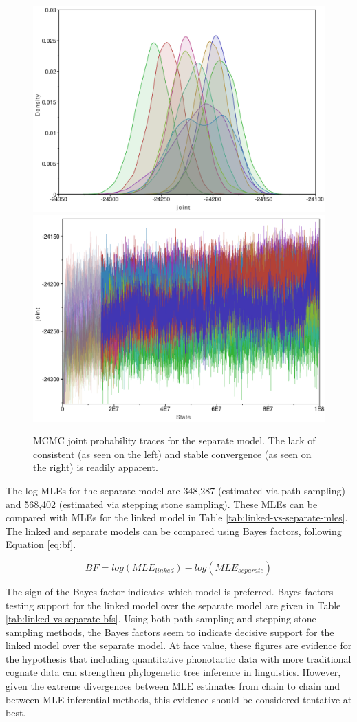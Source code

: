 \begin{figure}
\includegraphics[width=0.5\linewidth]{06-tree-inference/fig/sep_trace_ch1-10} \includegraphics[width=0.5\linewidth]{06-tree-inference/fig/sep_trace_dens_ch1-10} \caption[MCMC joint probability traces for the separate model]{MCMC joint probability traces for the separate model. The lack of consistent (as seen on the left) and stable convergence (as seen on the right) is readily apparent.}\label{fig:separate-all-trace}
\end{figure}

The log MLEs for the separate model are 348,287 (estimated via path sampling) and 568,402 (estimated via stepping stone sampling). These MLEs can be compared with MLEs for the linked model in Table \ref{tab:linked-vs-separate-mles}. The linked and separate models can be compared using Bayes factors, following Equation \eqref{eq:bf}.

\begin{equation}
BF = log(MLE_{linked}) - log(MLE_{separate})
\label{eq:bf}
\end{equation}

The sign of the Bayes factor indicates which model is preferred. Bayes factors testing support for the linked model over the separate model are given in Table \ref{tab:linked-vs-separate-bfs}. Using both path sampling and stepping stone sampling methods, the Bayes factors seem to indicate decisive support for the linked model over the separate model. At face value, these figures are evidence for the hypothesis that including quantitative phonotactic data with more traditional cognate data can strengthen phylogenetic tree inference in linguistics. However, given the extreme divergences between MLE estimates from chain to chain and between MLE inferential methods, this evidence should be considered tentative at best.

